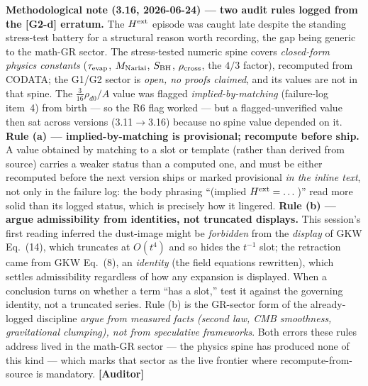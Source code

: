 \documentclass[11pt]{article}
\newcommand{\Auditor}{\textbf{\textcolor{teal!55!black}{[Auditor]}}}
\begin{document}
{\smallskip\noindent\textbf{Methodological note (3.16, 2026-06-24) --- two audit rules logged from the [G2-d] erratum.} The $H^{\rm ext}$ episode was caught late despite the standing stress-test battery for a structural reason worth recording, the gap being generic to the math-GR sector. The stress-tested numeric spine covers \emph{closed-form physics constants} ($\tau_{\rm evap}$, $M_{\rm Nariai}$, $S_{\rm BH}$, $\rho_{\rm cross}$, the $4/3$ factor), recomputed from CODATA; the G1/G2 sector is \emph{open, no proofs claimed}, and its values are not in that spine. The $\tfrac{3}{16}\rho_{d0}/A$ value was flagged \emph{implied-by-matching} (failure-log item~4) from birth --- so the R6 flag worked --- but a flagged-unverified value then sat across versions (3.11$\to$3.16) because no spine value depended on it. \textbf{Rule (a) --- implied-by-matching is provisional; recompute before ship.} A value obtained by matching to a slot or template (rather than derived from source) carries a weaker status than a computed one, and must be either recomputed before the next version ships or marked provisional \emph{in the inline text}, not only in the failure log: the body phrasing ``(implied $H^{\rm ext}=\dots$)'' read more solid than its logged status, which is precisely how it lingered. \textbf{Rule (b) --- argue admissibility from identities, not truncated displays.} This session's first reading inferred the dust-image might be \emph{forbidden} from the \emph{display} of GKW Eq.~(14), which truncates at $O(t^4)$ and so hides the $t^{-1}$ slot; the retraction came from GKW Eq.~(8), an \emph{identity} (the field equations rewritten), which settles admissibility regardless of how any expansion is displayed. When a conclusion turns on whether a term ``has a slot,'' test it against the governing identity, not a truncated series. Rule (b) is the GR-sector form of the already-logged discipline \emph{argue from measured facts (second law, CMB smoothness, gravitational clumping), not from speculative frameworks}. Both errors these rules address lived in the math-GR sector --- the physics spine has produced none of this kind --- which marks that sector as the live frontier where recompute-from-source is mandatory. \Auditor

}
\end{document}
